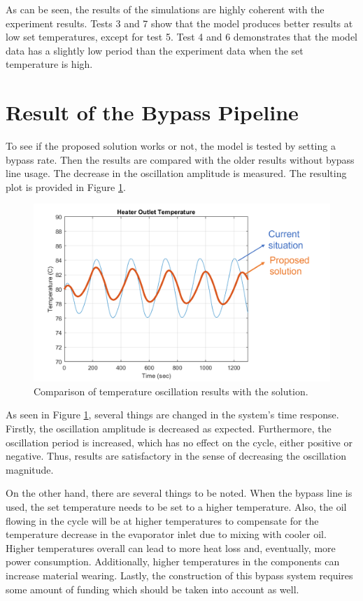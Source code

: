 As can be seen, the results of the simulations are highly coherent with the experiment results. Tests 3 and 7 show that the model produces better results at low set temperatures, except for test 5. Test 4 and 6 demonstrates that the model data has a slightly low period than the experiment data when the set temperature is high.

\section{Result of the Bypass Pipeline}

To see if the proposed solution works or not, the model is tested by setting a bypass rate. Then the results are compared with the older results without bypass line usage. The decrease in the oscillation amplitude is measured. The resulting plot is provided in Figure \ref{fig:result}.

\begin{figure}[H]
    \centering
    \includegraphics[width=12cm]{images/result.png}
    \caption{Comparison of temperature oscillation results with the solution.}
    \label{fig:result}
\end{figure}

As seen in Figure \ref{fig:result}, several things are changed in the system's time response. Firstly, the oscillation amplitude is decreased as expected. Furthermore, the oscillation period is increased, which has no effect on the cycle, either positive or negative. Thus, results are satisfactory in the sense of decreasing the oscillation magnitude.

\par
On the other hand, there are several things to be noted. When the bypass line is used, the set temperature needs to be set to a higher temperature. Also, the oil flowing in the cycle will be at higher temperatures to compensate for the temperature decrease in the evaporator inlet due to mixing with cooler oil. Higher temperatures overall can lead to more heat loss and, eventually, more power consumption. Additionally, higher temperatures in the components can increase material wearing. Lastly, the construction of this bypass system requires some amount of funding which should be taken into account as well.

